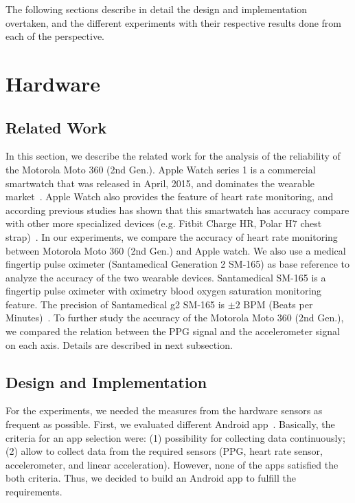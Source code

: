 \documentclass[11pt, draftclsnofoot, onecolumn]{IEEEtran}
\begin{document}
The following sections describe in detail the design and implementation overtaken, and the different experiments with their respective results done from each of the perspective. 

	\section{Hardware} \label{sec:Hardware}
    
    \subsection{Related Work} \label{subsec:HardwareRelatedWork}
    In this section, we describe the related work for the analysis of the reliability of the Motorola Moto 360 (2nd Gen.). Apple Watch series 1 is a commercial smartwatch that was released in April, 2015, and dominates the wearable market~\cite{IDC2016WearableQ3}. Apple Watch also provides the feature of heart rate monitoring, and according previous studies has shown that this smartwatch has accuracy compare with other more specialized devices (e.g. Fitbit Charge HR, Polar H7 chest strap)~\cite{TomGuideHRComparison2015}. In our experiments, we compare the accuracy of heart rate monitoring between Motorola Moto 360 (2nd Gen.) and Apple watch. We also use a medical fingertip pulse oximeter (Santamedical Generation 2 SM-165) as base reference to analyze the accuracy of the two wearable devices. Santamedical SM-165 is a fingertip pulse oximeter with oximetry blood oxygen saturation monitoring feature. The precision of Santamedical g2 SM-165 is $\pm2$ BPM (Beats per Minutes)~\cite{SantamedicalSM165}. To further study the accuracy of the Motorola Moto 360 (2nd Gen.), we compared the relation between the PPG signal and the accelerometer signal on each axis. Details are described in next subsection.
    
	\subsection{Design and Implementation} \label{subsec:HarwareDesignImpl} %
	
    For the experiments, we needed the measures from the hardware sensors as frequent as possible. First, we evaluated different Android app~\cite{GooglFitness,MotoBody,HearRateOs,SensorDashBoard}. Basically, the criteria for an app selection were: (1) possibility for collecting data continuously; (2) allow to collect data from the required sensors (PPG, heart rate sensor, accelerometer, and linear acceleration). However, none of the apps satisfied the both criteria. Thus, we decided to build an Android app to fulfill the requirements.
    
\end{document}
